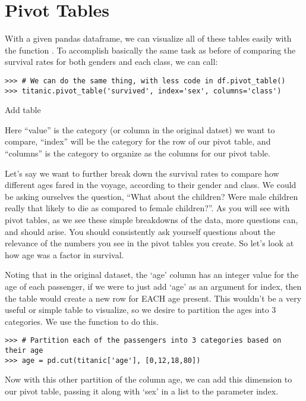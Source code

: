 \section*{Pivot Tables}
With a given pandas dataframe, we can visualize all of these tables easily with the function . To accomplish basically the same task as before of comparing the survival rates for both genders and each class, we can call:

\begin{lstlisting}
>>> # We can do the same thing, with less code in df.pivot_table()
>>> titanic.pivot_table('survived', index='sex', columns='class')
\end{lstlisting}

Add table

Here ``value'' is the category (or column in the original datset) we want to compare, ``index'' will be the category for the row of our pivot table, and ``columns'' is the category to organize as the columns for our pivot table.

Let's say we want to further break down the survival rates to compare how different ages fared in the voyage, according to their gender and class. We could be asking ourselves the question, ``What about the children? Were male children really that likely to die as compared to female children?''. As you will see with pivot tables, as we see these simple breakdowns of the data, more questions can, and should arise. You should consistently ask yourself questions about the relevance of the numbers you see in the pivot tables you create. So let's look at how age was a factor in survival.

Noting that in the original dataset, the `age' column has an integer value for the age of each passenger, if we were to just add `age' as an argument for index, then the table would create a new row for EACH age present. This wouldn't be a very useful or simple table to visualize, so we desire to partition the ages into 3 categories. We use the function  to do this.

\begin{lstlisting}
>>> # Partition each of the passengers into 3 categories based on their age
>>> age = pd.cut(titanic['age'], [0,12,18,80])
\end{lstlisting}

Now with this other partition of the column age, we can add this dimension to our pivot table, passing it along with `sex' in a list to the parameter index.

